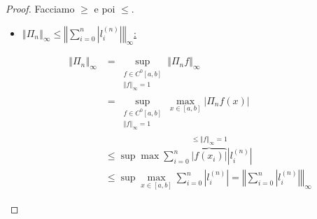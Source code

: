 \documentclass[a4paper,10pt]{article}
\theoremstyle{definition}
\theoremstyle{indentdefinition}
\theoremstyle{indenttheorem}
\theoremstyle{myremark}
\theoremstyle{indentgeneral}
\theoremstyle{plain}
\theoremstyle{plain}
\begin{document}
\begin{proof}
    Facciamo $\ge$ e poi $\le$.
    \begin{itemize}
        \item \underline{$\left\Vert \Pi_{n}\right\Vert _{\infty}\le\left\Vert \sum_{i=0}^{n}\left|l_{i}^{\left(n\right)}\right|\right\Vert _{\infty}$:}

\begin{align*}
    \left\Vert \Pi_{n}\right\Vert _{\infty}&=\sup_{\substack{f\in C^{0}\left[a,b\right]\\
\left\Vert f\right\Vert _{\infty}=1
}
}\left\Vert \Pi_{n}f\right\Vert _{\infty}\\
&=\sup_{\substack{f\in C^{0}\left[a,b\right]\\
\left\Vert f\right\Vert _{\infty}=1
}
}\max_{x\in\left[a,b\right]}\left|\Pi_{n}f\left(x\right)\right|\\
&\leq\sup\max\sum_{i=0}^{n}\overset{\leq\left\Vert f\right\Vert _{\infty}=1}{\overbrace{\left|f\left(x_{i}\right)\right|}}\left|l_{i}^{\left(n\right)}\right|\\
&\leq\sup\max_{x\in\left[a,b\right]}\sum_{i=0}^{n}\left|l_{i}^{\left(n\right)}\right|=\left\Vert \sum_{i=0}^{n}\left|l_{i}^{\left(n\right)}\right|\right\Vert _{\infty}
\end{align*}



\end{itemize}
\end{proof}
\end{document}
